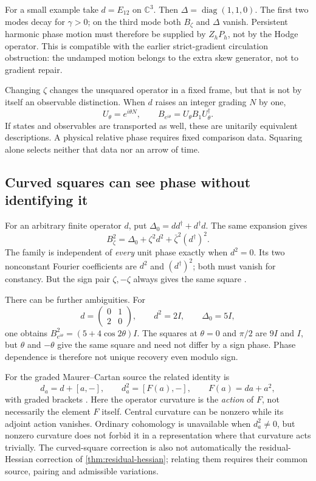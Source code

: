 \documentclass[11pt,a4paper]{article}
\begin{document}
For a small example take \(d=E_{12}\) on \(\mathbb C^3\). Then
\(\Delta=\operatorname{diag}(1,1,0)\). The first two modes decay for
\(\gamma>0\); on the third mode both \(B_\zeta\) and \(\Delta\)
vanish. Persistent harmonic phase motion must therefore be supplied by
\(Z_hP_h\), not by the Hodge operator. This is compatible with the
earlier strict-gradient circulation obstruction: the undamped motion
belongs to the extra skew generator, not to gradient repair.

Changing \(\zeta\) changes the unsquared operator in a fixed frame, but
that is not by itself an observable distinction. When \(d\) raises an
integer grading \(N\) by one,
\[
 U_\theta=e^{i\theta N},\qquad
 B_{e^{i\theta}}=U_\theta B_1U_\theta^\dagger.
\]
If states and observables are transported as well, these are unitarily
equivalent descriptions. A physical relative phase requires fixed
comparison data. Squaring alone selects neither that data nor an arrow
of time.

\subsection{Curved squares can see phase without identifying it}
\label{sec:curved-phase-boundary}
For an arbitrary finite operator \(d\), put
\(\Delta_0=dd^\dagger+d^\dagger d\). The same expansion gives
\[
 B_\zeta^2=\Delta_0+\zeta^2d^2+
                  \bar\zeta^2(d^\dagger)^2.
\]
The family is independent of \emph{every} unit phase exactly when
\(d^2=0\). Its two nonconstant Fourier coefficients are \(d^2\) and
\((d^\dagger)^2\); both must vanish for constancy. But the sign pair
\(\zeta,-\zeta\) always gives the same square
\cite{PreprojectionCurvedCharge2026}.

There can be further ambiguities. For
\[
 d=\begin{pmatrix}0&1\\2&0\end{pmatrix},\qquad
 d^2=2I,\qquad \Delta_0=5I,
\]
one obtains \(B_{e^{i\theta}}^2=(5+4\cos2\theta)I\). The squares
at \(\theta=0\) and \(\pi/2\) are \(9I\) and \(I\), but
\(\theta\) and \(-\theta\) give the same square and need not differ
by a sign phase. Phase dependence is therefore not unique recovery even
modulo sign.

For the graded Maurer--Cartan source the related identity is
\[
 d_a=d+[a,-],\qquad d_a^2=[F(a),-],\qquad F(a)=da+a^2,
\]
with graded brackets \cite{DotsenkoShadrinVallette2022}. Here the operator
curvature is the \emph{action} of \(F\), not necessarily the element
\(F\) itself. Central curvature can be nonzero while its adjoint action
vanishes. Ordinary cohomology is unavailable when \(d_a^2\ne0\), but
nonzero curvature does not forbid it in a representation where that
curvature acts trivially. The curved-square correction is also not
automatically the residual-Hessian correction of
\cref{thm:residual-hessian}; relating them requires their common source,
pairing and admissible variations.
\end{document}
